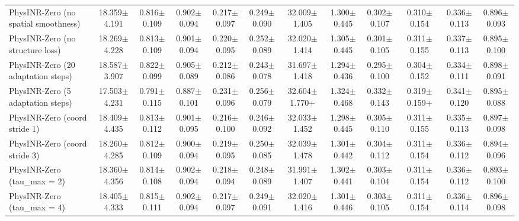\documentclass[journal]{IEEEtran}
\begin{document}
\begin{table}
{\begin{tabular}{lccccccccccc}
PhysINR-Zero (no spatial smoothness) & 18.359$\pm$4.191 & 0.816$\pm$0.109 & 0.902$\pm$0.094 & 0.217$\pm$0.097 & 0.249$\pm$0.090 & 32.009$\pm$1.405 & 1.300$\pm$0.445 & 0.302$\pm$0.107 & 0.310$\pm$0.154 & 0.336$\pm$0.113 & 0.896$\pm$0.093 \\
PhysINR-Zero (no structure loss) & 18.269$\pm$4.228 & 0.813$\pm$0.109 & 0.901$\pm$0.094 & 0.220$\pm$0.095 & 0.252$\pm$0.089 & 32.020$\pm$1.414 & 1.305$\pm$0.445 & 0.301$\pm$0.105 & 0.311$\pm$0.155 & 0.337$\pm$0.113 & 0.895$\pm$0.100 \\
PhysINR-Zero (20 adaptation steps) & 18.587$\pm$3.907 & 0.822$\pm$0.099 & 0.905$\pm$0.089 & 0.212$\pm$0.086 & 0.243$\pm$0.078 & 31.697$\pm$1.418 & 1.294$\pm$0.436 & 0.295$\pm$0.100 & 0.304$\pm$0.152 & 0.334$\pm$0.111 & 0.898$\pm$0.091 \\
PhysINR-Zero (5 adaptation steps) & 17.503$\pm$4.231 & 0.791$\pm$0.115 & 0.887$\pm$0.101 & 0.231$\pm$0.096 & 0.256$\pm$0.079 & 32.604$\pm$1.770+ & 1.324$\pm$0.468 & 0.332$\pm$0.143 & 0.319$\pm$0.159+ & 0.341$\pm$0.120 & 0.895$\pm$0.088 \\
PhysINR-Zero (coord stride 1) & 18.409$\pm$4.435 & 0.813$\pm$0.112 & 0.901$\pm$0.095 & 0.216$\pm$0.100 & 0.246$\pm$0.092 & 32.033$\pm$1.452 & 1.298$\pm$0.445 & 0.305$\pm$0.110 & 0.311$\pm$0.155 & 0.335$\pm$0.113 & 0.897$\pm$0.098 \\
PhysINR-Zero (coord stride 3) & 18.260$\pm$4.285 & 0.812$\pm$0.109 & 0.900$\pm$0.094 & 0.219$\pm$0.095 & 0.250$\pm$0.085 & 32.039$\pm$1.478 & 1.301$\pm$0.442 & 0.304$\pm$0.112 & 0.311$\pm$0.154 & 0.336$\pm$0.112 & 0.894$\pm$0.096 \\
PhysINR-Zero (tau\_max = 2) & 18.360$\pm$4.356 & 0.814$\pm$0.108 & 0.902$\pm$0.094 & 0.218$\pm$0.094 & 0.248$\pm$0.089 & 31.991$\pm$1.407 & 1.302$\pm$0.441 & 0.303$\pm$0.104 & 0.311$\pm$0.154 & 0.336$\pm$0.112 & 0.893$\pm$0.100 \\
PhysINR-Zero (tau\_max = 4) & 18.405$\pm$4.333 & 0.815$\pm$0.111 & 0.902$\pm$0.094 & 0.217$\pm$0.097 & 0.249$\pm$0.091 & 32.020$\pm$1.416 & 1.301$\pm$0.446 & 0.303$\pm$0.105 & 0.311$\pm$0.154 & 0.336$\pm$0.114 & 0.896$\pm$0.098 \\
\bottomrule
\end{tabular}
}
\end{table}
\end{document}
